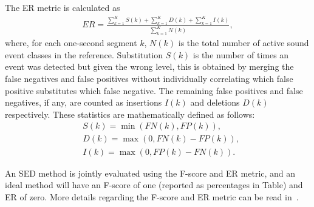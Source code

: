 \documentclass[journal]{IEEEtran}
\begin{document}
The ER metric is calculated as
\begin{align}
ER = \frac{\sum_{k=1}^{K} S(k) + \sum_{k=1}^{K} D(k) + \sum_{k=1}^{K} I(k)}{\sum_{k=1}^{K} N(k)},
\label{Eqn:ER}
\end{align}
%
where, for each one-second segment $k$, $N(k)$ is the total number of active sound event classes in the reference. Substitution $S(k)$ is the number of times an event was detected but given the wrong level, this is obtained by merging the false negatives and false positives without individually correlating which false positive substitutes which false negative. The remaining false positives and false negatives, if any, are counted as insertions $I(k)$ and deletions $D(k)$ respectively. These statistics are mathematically defined as follows:
%
\begin{align}
& S(k) = \min(FN(k), FP(k)), \\
& D(k) = \max(0, FN(k)-FP(k)), \\
& I(k) = \max(0, FP(k)-FN(k)). 
\end{align}

An SED method is jointly evaluated using the F-score and ER metric, and an ideal method will have an F-score of one (reported as percentages in Table) and ER of zero. More details regarding the F-score and ER metric can be read in~\cite{metrics, CASSE:2018}.
\end{document}
